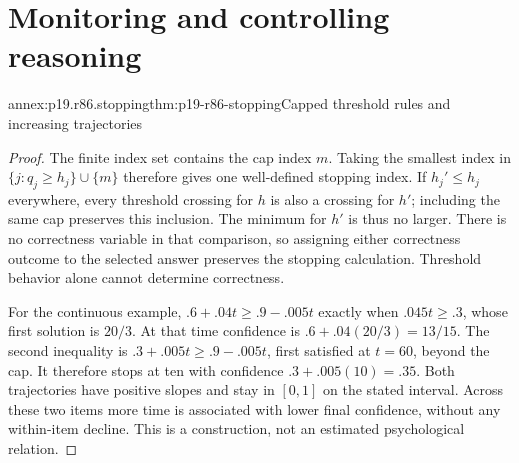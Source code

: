 \section{Monitoring and controlling reasoning}
\label{sec:p19-annex-rationality-8-6}

\begin{annexitem}{annex:p19.r86.stopping}{thm:p19-r86-stopping}{Capped threshold rules and increasing trajectories}
\begin{proof}
The finite index set contains the cap index \(m\). Taking the smallest
index in \(\{j:q_j\geq h_j\}\cup\{m\}\) therefore gives one
well-defined stopping index. If \(h_j'\leq h_j\) everywhere, every
threshold crossing for \(h\) is also a crossing for \(h'\); including
the same cap preserves this inclusion. The minimum for \(h'\) is thus
no larger. There is no correctness variable in that comparison, so assigning
either correctness outcome to the selected answer preserves the stopping
calculation. Threshold behavior alone cannot determine correctness.

For the continuous example,
\(.6+.04t\geq.9-.005t\) exactly when
\(.045t\geq.3\), whose first solution is \(20/3\).
At that time confidence is \(.6+.04(20/3)=13/15\).
The second inequality is \(.3+.005t\geq.9-.005t\), first satisfied
at \(t=60\), beyond the cap. It therefore stops at ten with confidence
\(.3+.005(10)=.35\). Both trajectories have positive slopes and stay
in \([0,1]\) on the stated interval. Across these two items more time
is associated with lower final confidence, without any within-item decline.
This is a construction, not an estimated psychological relation.
\end{proof}
\end{annexitem}

